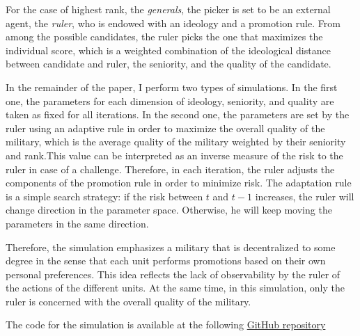 For the case of highest rank, the \emph{generals}, the picker is set to be an
external agent, the \emph{ruler}, who is endowed with an ideology and a
promotion rule. From among the possible candidates, the ruler picks the one that
maximizes the individual score, which is a weighted combination of the
ideological distance between candidate and ruler, the seniority, and the quality
of the candidate.

In the remainder of the paper, I perform two types of simulations. In the first
one, the parameters for each dimension of ideology, seniority, and quality are
taken as fixed for all iterations. In the second one, the parameters are set by
the ruler using an adaptive rule in order to maximize the overall quality of the
military, which is the average quality of the military weighted by their
seniority and rank.This value can be interpreted as an inverse measure of the
risk to the ruler in case of a challenge. Therefore, in each iteration, the
ruler adjusts the components of the promotion rule in order to minimize risk.
The adaptation rule is a simple search strategy: if the risk between $t$ and
$t-1$ increases, the ruler will change direction in the parameter space.
Otherwise, he will keep moving the parameters in the same direction.

Therefore, the simulation emphasizes a military that is decentralized to some
degree in the sense that each unit performs promotions based on their own
personal preferences. This idea reflects the lack of observability by the ruler
of the actions of the different units. At the same time, in this simulation,
only the ruler is concerned with the overall quality of the military.

The code for the simulation is available at the following
\href{https://griverorz@github.org/griverorz/promotions}{GitHub repository}

